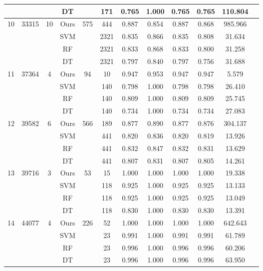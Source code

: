 \begin{table}[htbp]
\begin{tabular}{cccccccccccc}
           &       &   & DT   &     & 171 & 0.765 & 1.000 & 0.765 & 0.765 & 110.804 \\
        \midrule
        10 & 33315 & 10 & Ours & 575 & 444 & 0.887 & 0.854 & 0.887 & 0.868 & 985.966 \\
           &       &    & SVM  &     & 2321 & 0.835 & 0.866 & 0.835 & 0.808 & 31.634 \\
           &       &    & RF   &     & 2321 & 0.833 & 0.868 & 0.833 & 0.800 & 31.258 \\
           &       &    & DT   &     & 2321 & 0.797 & 0.840 & 0.797 & 0.756 & 31.688 \\
        \midrule
        11 & 37364 & 4 & Ours & 94  & 10  & 0.947 & 0.953 & 0.947 & 0.947 & 5.579 \\
           &       &   & SVM  &     & 140 & 0.798 & 1.000 & 0.798 & 0.798 & 26.410 \\
           &       &   & RF   &     & 140 & 0.809 & 1.000 & 0.809 & 0.809 & 25.745 \\
           &       &   & DT   &     & 140 & 0.734 & 1.000 & 0.734 & 0.734 & 27.083 \\
        \midrule
        12 & 39582 & 6 & Ours & 566 & 189 & 0.877 & 0.890 & 0.877 & 0.876 & 304.137 \\
           &       &   & SVM  &     & 441 & 0.820 & 0.836 & 0.820 & 0.819 & 13.926 \\
           &       &   & RF   &     & 441 & 0.832 & 0.847 & 0.832 & 0.831 & 13.629 \\
           &       &   & DT   &     & 441 & 0.807 & 0.831 & 0.807 & 0.805 & 14.261 \\
        \midrule
        13 & 39716 & 3 & Ours & 53  & 15  & 1.000 & 1.000 & 1.000 & 1.000 & 19.338 \\
           &       &   & SVM  &     & 118 & 0.925 & 1.000 & 0.925 & 0.925 & 13.133 \\
           &       &   & RF   &     & 118 & 0.925 & 1.000 & 0.925 & 0.925 & 13.049 \\
           &       &   & DT   &     & 118 & 0.830 & 1.000 & 0.830 & 0.830 & 13.391 \\
        \midrule
        14 & 44077 & 4 & Ours & 226 & 52  & 1.000 & 1.000 & 1.000 & 1.000 & 642.643 \\
           &       &   & SVM  &     & 23  & 0.991 & 1.000 & 0.991 & 0.991 & 61.789 \\
           &       &   & RF   &     & 23  & 0.996 & 1.000 & 0.996 & 0.996 & 60.206 \\
           &       &   & DT   &     & 23  & 0.996 & 1.000 & 0.996 & 0.996 & 63.950 \\
    
    \bottomrule
  \end{tabular}
\end{table}

